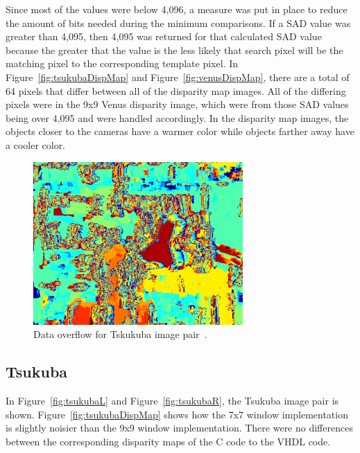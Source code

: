 Since most of the values were below 4,096, a measure was put in place to reduce the amount of bits needed during the minimum comparisons. If a SAD value was greater than 4,095, then 4,095 was returned for that calculated SAD value because the greater that the value is the less likely that search pixel will be the matching pixel to the corresponding template pixel. In Figure~\ref{fig:tsukubaDispMap} and Figure~\ref{fig:venusDispMap}, there are a total of 64 pixels that differ between all of the disparity map images. All of the differing pixels were in the 9x9 Venus disparity image, which were from those SAD values being over 4,095 and were handled accordingly. In the disparity map images, the objects closer to the cameras have a warmer color while objects farther away have a cooler color. %

\begin{figure}[h]
	\begin{center}
		\includegraphics[width=80mm]{figures/tsukuba_disp9x9_2_sad_overflow.png}
		\captionfonts
		\caption{Data overflow for Tskukuba image pair~\cite{middlebury}.}
		\label{fig:overflow}
	\end{center}
\end{figure}

\subsection{Tsukuba}
\label{sec:tsukuba}

In Figure~\ref{fig:tsukubaL} and Figure~\ref{fig:tsukubaR}, the Tsukuba image pair is shown. Figure~\ref{fig:tsukubaDispMap} shows how the 7x7 window implementation is slightly noisier than the 9x9 window implementation. There were no differences between the corresponding disparity maps of the C code to the VHDL code.

